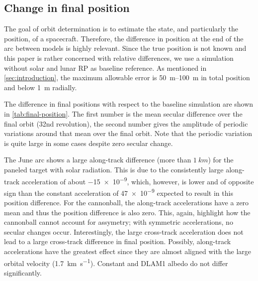 \subsection{Change in final position}
The goal of orbit determination is to estimate the state, and particularly the position, of a spacecraft. Therefore, the difference in position at the end of the arc between models is highly relevant. Since the true position is not known and this paper is rather concerned with relative differences, we use a simulation without solar and lunar \gls{RP} as baseline reference. As mentioned in \cref{sec:introduction}, the maximum allowable error is \qtyrange{50}{100}{\m} in total position and below \qty{1}{\m} radially.

\begin{table}[t]
    \caption{Difference of final position in \unit{\m} with respect to no-\gls{RP} baseline, given as mean over the final orbit plus/minus periodic variations around that mean in the final orbit. The largest changes are in the along-track position. $\mathbf{A}$: solar only; $\mathbf{B}$: lunar only (thermal + constant albedo); $\mathbf{C}$: lunar only (thermal + \gls{DLAM1} albedo); $\mathbf{D}$: solar + lunar (thermal + \gls{DLAM1} albedo).}
    \label{tab:final-position}
    \begin{subtable}[c]{\textwidth}
        
     \end{subtable}

     \medskip

     \begin{subtable}[c]{\textwidth}
        
     \end{subtable}
\end{table}

The difference in final positions with respect to the baseline simulation are shown in \cref{tab:final-position}. The first number is the mean secular difference over the final orbit (32nd revolution), the second number gives the amplitude of periodic variations around that mean over the final orbit. Note that the periodic variation is quite large in some cases despite zero secular change.

The June arc shows a large along-track difference (more than $\qty{1}{km}$) for the paneled target with solar radiation. This is due to the consistently large along-track acceleration of about \qty{-15e-9}{\acc}, which, however, is lower and of opposite sign than the constant acceleration of \qty{47e-9}{\acc} expected to result in this position difference. For the cannonball, the along-track accelerations have a zero mean and thus the position difference is also zero. This, again, highlight how the cannonball cannot account for assymetry; with symmetric accelerations, no secular changes occur. Interestingly, the large cross-track acceleration does not lead to a large cross-track difference in final position. Possibly, along-track accelerations have the greatest effect since they are almost aligned with the large orbital velocity (\qty{1.7}{\km\per\s}). Constant and \gls{DLAM1} albedo do not differ significantly.

